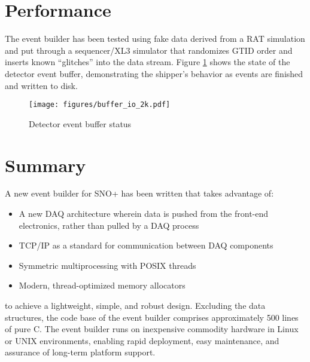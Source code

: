 \documentclass[11pt,twocolumn]{article}
\begin{document}
\section{Performance}
The event builder has been tested using fake data derived from a RAT simulation and put through a sequencer/XL3 simulator that randomizes GTID order and inserts known ``glitches'' into the data stream. Figure \ref{pointers_2k} shows the state of the detector event buffer, demonstrating the shipper's behavior as events are finished and written to disk.
\begin{figure}[htp]
\centering
\texttt{[image: figures/buffer\_io\_2k.pdf]}
\caption{Detector event buffer status}
\label{pointers_2k}
\end{figure}

\section{Summary}
A new event builder for SNO+ has been written that takes advantage of:
\begin{itemize}
\item A new DAQ architecture wherein data is pushed from the front-end electronics, rather than pulled by a DAQ process
\item TCP/IP as a standard for communication between DAQ components
\item Symmetric multiprocessing with POSIX threads
\item Modern, thread-optimized memory allocators
\end{itemize}

to achieve a lightweight, simple, and robust design. Excluding the data structures, the code base of the event builder comprises approximately 500 lines of pure C. The event builder runs on inexpensive commodity hardware in Linux or UNIX environments, enabling rapid deployment, easy maintenance, and assurance of long-term platform support.
\end{document}
